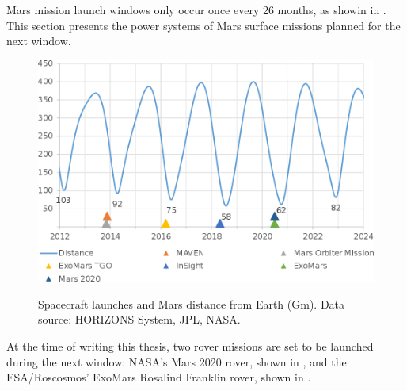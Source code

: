 Mars mission launch windows only occur once every 26 months, as showin in . This section presents the power systems of Mars surface missions planned for the next window.

\begin{figure}[h]
  \captionsetup[subfigure]{justification=centering}
  \centering
  \hypersetup{linkcolor=captionTextColor}
  \includegraphics[width=0.5\linewidth]{sections/state-of-the-art/planned-missions/plots/mars-distance-from-earth.png}\\
  \caption[Spacecraft launches and Mars distance from Earth]
          {Spacecraft launches and Mars distance from Earth (Gm). Data source: HORIZONS System, JPL, NASA.}
  \label{fig:mars-distance-from-earth}
\end{figure}

At the time of writing this thesis, two rover missions are set to be launched during the next window: \ac{NASA}'s Mars 2020 rover, shown in , and the \ac{ESA}/Roscosmos' ExoMars Rosalind Franklin rover, shown in .

\vspace{0.5cm}

